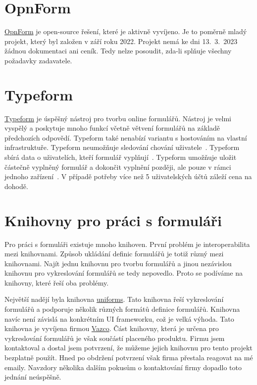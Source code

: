 \section*{OpnForm}\label{sec:opnform}

\href{https://opnform.com/}{OpnForm} je open-source řešení, které je aktivně vyvíjeno.
Je to poměrně mladý projekt, který byl založen v září roku 2022.
Projekt nemá ke dni 13.~3.~2023 žádnou dokumentaci ani ceník.
Tedy nelze posoudit, zda-li splňuje všechny požadavky zadavatele.

\section*{Typeform}\label{sec:typeform}

\href{https://www.typeform.com/}{Typeform} je úspěšný nástroj pro tvorbu online formulářů.
Nástroj je velmi vyspělý a poskytuje mnoho funkcí včetně větvení formulářů na základě předchozích odpovědí.
Typeform také nenabízí variantu s hostováním na vlastní infrastruktuře.
Typeform neumožňuje sledování chování uživatele~\cite{user-tracking-typeform}.
Typeform sbírá data o uživatelích, kteří formulář vyplňují~\cite{user-data-typeform}.
Typeform umožňuje uložit částečně vyplněný formulář a dokončit vyplnění později, ale pouze v rámci jednoho zařízení~\cite{save-and-return-typeform}.
V případě potřeby více než 5 uživatelských účtů záleží cena na dohodě.

\section*{Knihovny pro práci s formuláři}\label{sec:knihovny-pro-praci-s-formulari}

Pro práci s formuláři existuje mnoho knihoven.
První problém je interoperabilita mezi knihovnami.
Způsob ukládání definic formulářů je totiž různý mezi knihovnami.
Najít jednu knihovnu pro tvorbu formulářů a jinou nezávislou knihovnu pro vykreslování formulářů se tedy nepovedlo.
Proto se podíváme na knihovny, které řeší oba problémy.

Největší nadějí byla knihovna \href{https://uniforms.tools/}{uniforms}.
Tato knihovna řeší vykreslování formulářů a podporuje několik různých formátů definice formulářů.
Knihovna navíc není závislá na konkrétním UI frameworku, což je velká výhoda.
Tato knihovna je vyvíjena firmou \href{https://www.vazco.eu/}{Vazco}.
Část knihovny, která je určena pro vykreslování formulářů je však součástí placeného produktu.
Firmu jsem kontaktoval a dostal jsem potvrzení, že můžeme jejich knihovnu pro tento projekt bezplatně použít.
Hned po obdržení potvrzení však firma přestala reagovat na mé emaily.
Navzdory několika dalším pokusům o kontaktování firmy dopadlo toto jednání neúspěšně.

